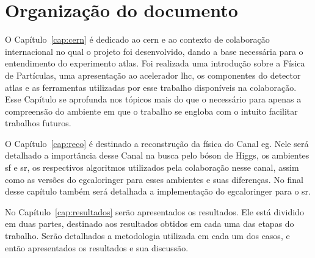 \section{Organização do documento} {{{

O Capítulo~\ref{cap:cern} é dedicado ao \gls{cern} e ao contexto de colaboração internacional
no qual o projeto foi desenvolvido, dando a base necessária para o entendimento
do experimento \gls{atlas}. Foi realizada uma introdução sobre a Física de
Partículas, uma apresentação ao acelerador \gls{lhc}, os componentes do detector \gls{atlas} 
e as ferramentas utilizadas por esse trabalho disponíveis na colaboração. Esse
Capítulo se aprofunda nos tópicos mais do que o necessário para apenas a
compreensão do ambiente em que o trabalho se engloba com o intuito facilitar
trabalhos futuros.

O Capítulo~\ref{cap:reco} é destinado a reconstrução da física do Canal
\acrshort{eg}. Nele será detalhado a importância desse Canal na busca pelo bóson de
Higgs, os ambientes \glsdesc{sf} e \glsdesc{sr}, os respectivos algoritmos utilizados
pela colaboração nesse canal, assim como as versões do \gls{egcaloringer} para
esses ambientes e suas diferenças. No final desse capítulo também será detalhada
a implementação do \gls{egcaloringer} para o \glsdesc{sr}.

No Capítulo~\ref{cap:resultados} serão apresentados os resultados. Ele
está dividido em duas partes, destinado aos resultados obtidos em cada uma das
etapas do trabalho. Serão detalhados a metodologia utilizada
em cada um dos casos, e então apresentados os resultados e sua discussão.
}}}
